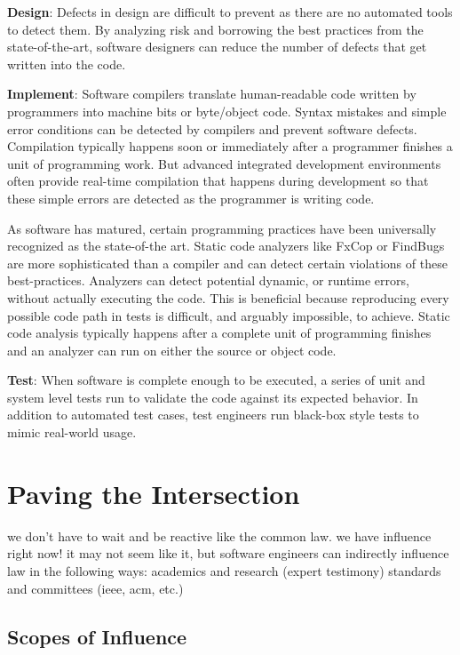 \documentclass[12pt]{report}
\begin{document}
\textbf{Design}: Defects in design are difficult to prevent as there are no automated tools to detect them. By analyzing risk and borrowing the best practices from the state-of-the-art, software designers can reduce the number of defects that get written into the code. 

\textbf{Implement}: Software compilers translate human-readable code written by programmers into machine bits or byte/object code. Syntax mistakes and simple error conditions can be detected by compilers and prevent software defects. Compilation typically happens soon or immediately after a programmer finishes a unit of programming work. But advanced integrated development environments often provide real-time compilation that happens during development so that these simple errors are detected as the programmer is writing code. 

As software has matured, certain programming practices have been universally recognized as the state-of-the art. Static code analyzers like FxCop or FindBugs are more sophisticated than a compiler and can detect certain violations of these best-practices. Analyzers can detect potential dynamic, or runtime errors, without actually executing the code. This is beneficial because reproducing every possible code path in tests is difficult, and arguably impossible, to achieve. Static code analysis typically happens after a complete unit of programming finishes and an analyzer can run on either the source or object code. 

\textbf{Test}: When software is complete enough to be executed, a series of unit and system level tests run to validate the code against its expected behavior. In  addition to automated test cases, test engineers run black-box style tests to mimic real-world usage. 

\chapter{Paving the Intersection} 
we don't have to wait and be reactive like the common law. we have influence right now! it may not seem like it, but software engineers can indirectly influence law in the following ways: 
academics and research (expert testimony) 
standards and committees (ieee, acm, etc.) 

\section{Scopes of Influence} 
\end{document}
